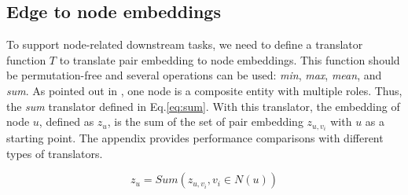 \documentclass[10pt,journal,compsoc]{IEEEtran}
\begin{document}
                                                                                                                                                                                                                                                            

















































\subsection{Edge to node embeddings}
To support node-related downstream tasks, we need to define a translator function $T$ to translate pair embedding to node embeddings. This function should be permutation-free and several operations can be used: \textit{min}, \textit{max},\textit{ mean}, and \textit{sum}. As pointed out in \cite{Epasto19}, one node is a composite entity with multiple roles. Thus, the \textit{sum} translator defined in Eq.\ref{eq:sum}. With this translator, the embedding of node $u$, defined as $z_u$, is the sum of the set of pair embedding $z_{u,v_i}$ with $u$ as a starting point. The appendix provides performance comparisons with different types of translators.




\begin{equation} 
  z_u = Sum\left(z_{u,v_i},v_i \in N(u)\right)
\label{eq:sum}
\end{equation}
\end{document}
